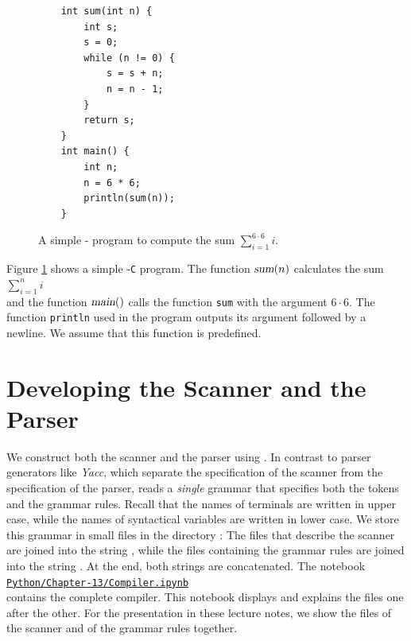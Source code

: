 \begin{figure}[!ht]
\centering
\begin{verbatim}
    int sum(int n) {
        int s;
        s = 0;
        while (n != 0) {
            s = s + n;
            n = n - 1;    
        }
        return s;
    }  
    int main() {
        int n;
        n = 6 * 6;
        println(sum(n));
    }
\end{verbatim}
\vspace*{-0.3cm}
\caption{A simple - program to compute the sum
  $\displaystyle \sum\limits_{i=1}^{6 \cdot 6} i$.}
\label{fig:sum.c}
\end{figure}

\noindent
Figure \ref{fig:sum.c} shows a simple -\texttt{C} program. The function $\textsl{sum}(n)$
calculates the sum 
\\[0.2cm]
\hspace*{1.3cm}
$\displaystyle\sum\limits_{i=1}^n i$
\\[0.2cm]
 and the function $\textsl{main}()$ calls the function \texttt{sum}
with the argument $6 \cdot 6$. The function \texttt{println} used in the program outputs its argument followed
by a newline. We assume that this function is predefined. 

\section{Developing the  Scanner and the Parser}
We construct both the scanner and the parser using .  In contrast to parser generators like
\textsl{Yacc}, which separate the specification of the scanner from the specification of the parser,
 reads a \emph{single} grammar that specifies both the tokens and the grammar rules.  Recall that
the names of terminals are written in upper case, while the names of syntactical variables are written in
lower case.  We store this grammar in small files in the directory :  The files that describe the
scanner are joined into the string , while the files containing the grammar rules are
joined into the string .  At the end, both strings are concatenated.  The notebook
\\[0.2cm]
\hspace*{1.3cm}
\href{https://github.com/karlstroetmann/Formal-Languages/blob/master/Python/Chapter-13/Compiler.ipynb}{\texttt{Python/Chapter-13/Compiler.ipynb}}
\\[0.2cm]
contains the complete compiler.  This notebook displays and explains the files one after the other.  For the
presentation in these lecture notes, we show the files of the scanner and of the grammar rules together.

